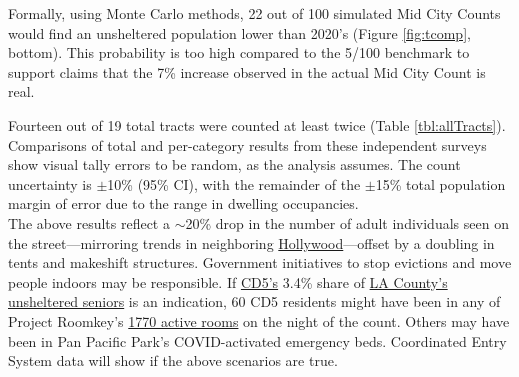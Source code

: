 \documentclass[11pt]{article}
\begin{document}
Formally, using Monte Carlo methods, 22 out of 100 simulated Mid City Counts would find an 
unsheltered population lower than 2020's (Figure \ref{fig:tcomp}, bottom). This probability is too high 
compared to the 5/100 benchmark to support claims that the 7\% increase observed in the actual 
Mid City Count is real.


Fourteen out of 19 total tracts were counted at least twice (Table \ref{tbl:allTracts}). 
Comparisons of total and per-category results from these independent surveys show visual 
tally errors to be random, as the analysis assumes. The count uncertainty is $\pm$10\% (95\% CI), 
with the remainder of the $\pm$15\% total population margin of error due to the range in 
dwelling occupancies.\\

 The above results reflect a $\sim$20\% drop in the number
of adult individuals seen on the street---mirroring trends in neighboring 
\href{https://www.latimes.com/homeless-housing/story/2021-04-13/despite-appearances-15-fewer-homeless-people-were-on-hollywood-streets-this-year}{Hollywood}---offset by a doubling in tents and 
makeshift structures. Government initiatives to stop evictions and move people indoors may be 
responsible. If \href{https://www.lahsa.org/documents?id=4664-2020-homeless-count-council-district-5}{CD5's} 3.4\% share of \href{https://www.lahsa.org/documents?id=4585-2020-greater-los-angeles-homeless-count-los-angeles-continuum-of-care-coc-}{LA County's unsheltered seniors} 
is an indication, 60 CD5 residents might have been in any of Project Roomkey's 
\href{https://projectroomkeytracker.com/}{1770 active rooms} on the night of the count. Others
may have been in Pan Pacific Park's COVID-activated emergency beds. Coordinated Entry System data 
will show if the above scenarios are true.
\end{document}
